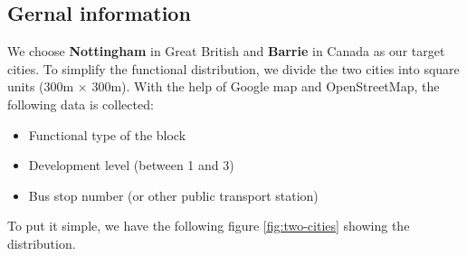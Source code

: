 \subsection{Gernal information}
We choose \textbf{Nottingham} in Great British and \textbf{Barrie} in Canada as our target cities.
To simplify the functional distribution, we divide the two cities into square units (300m $\times$ 300m).
With the help of Google map and OpenStreetMap, the following data is collected:
\begin{itemize}
  \item Functional type of the block
  \item Development level (between 1 and 3)
  \item Bus stop number (or other public transport station)
\end{itemize}
To put it simple, we have the following figure \ref{fig:two-cities} showing the distribution.
